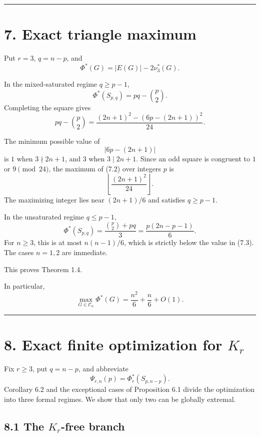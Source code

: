 \documentclass[11pt,a4paper]{article}
\begin{document}
\begin{center}\rule{0.5\linewidth}{0.5pt}\end{center}

\section{7. Exact triangle maximum}\label{exact-triangle-maximum}

Put \(r=3\), \(q=n-p\), and
\[
\Phi^*(G)=|E(G)|-2\nu_3^*(G).
\]

In the mixed-saturated regime \(q\ge p-1\),
\[
\Phi^*(S_{p,q})
=
pq-\binom p2.
\tag{7.1}
\]
Completing the square gives
\[
pq-\binom p2
=
\frac{(2n+1)^2-(6p-(2n+1))^2}{24}.
\tag{7.2}
\]

The minimum possible value of
\[
|6p-(2n+1)|
\]
is \(1\) when \(3\nmid 2n+1\), and \(3\) when
\(3\mid 2n+1\). Since an odd square is congruent to \(1\) or \(9\pmod{24}\),
the maximum of (7.2) over integers \(p\) is
\[
\left\lfloor\frac{(2n+1)^2}{24}\right\rfloor.
\tag{7.3}
\]
The maximizing integer lies near \((2n+1)/6\) and satisfies
\(q\ge p-1\).

In the unsaturated regime \(q\le p-1\),
\[
\Phi^*(S_{p,q})
=
\frac{\binom p2+pq}{3}
=
\frac{p(2n-p-1)}6.
\tag{7.4}
\]
For \(n\ge3\), this is at most \(n(n-1)/6\), which is strictly below the
value in (7.3). The cases \(n=1,2\) are immediate.

This proves Theorem 1.4.

In particular,
\[
\max_{G\in\mathcal C_n}\Phi^*(G)
=
\frac{n^2}{6}+\frac n6+O(1).
\tag{7.5}
\]

\begin{center}\rule{0.5\linewidth}{0.5pt}\end{center}

\section{\texorpdfstring{8. Exact finite optimization for \(K_r\)}{8. Exact finite optimization for K\_r}}\label{exact-finite-optimization-for-k_r}

Fix \(r\ge3\), put \(q=n-p\), and abbreviate
\[
\Psi_{r,n}(p)=\Phi_r^*(S_{p,n-p}).
\]
Corollary 6.2 and the exceptional cases of Proposition 6.1 divide the
optimization into three formal regimes. We show that only two can be
globally extremal.

\subsection{\texorpdfstring{8.1 The \(K_r\)-free branch}{8.1 The K\_r-free branch}}\label{the-k_r-free-branch}
\end{document}
